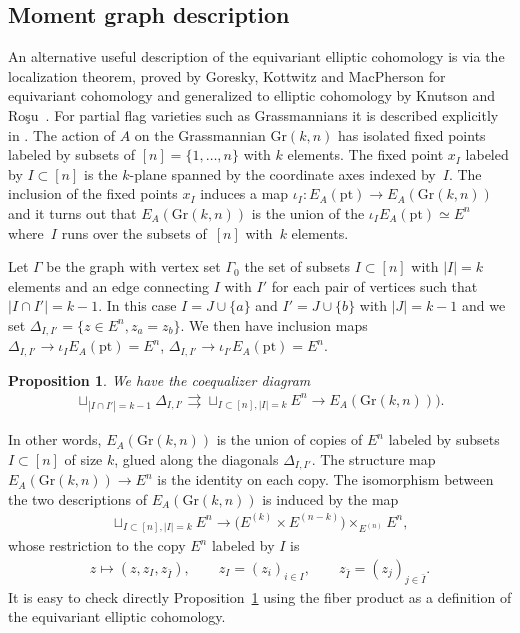 \documentclass[pdftex]{sigma}
\numberwithin{equation}{section}
\newtheorem{Proposition}[Theorem]{Proposition}
 { \theoremstyle{definition}
\newtheorem{Definition}[Theorem]{Definition}
\newtheorem{Example}[Theorem]{Example}
\newtheorem{Remark}[Theorem]{Remark} }
\begin{document}
\subsection{Moment graph description} An alternative useful description of the equivariant elliptic cohomology is via the localization theorem, proved by Goresky, Kottwitz and MacPherson \cite{GKM} for equivariant cohomology and generalized to elliptic cohomology by Knutson and Ro\c{s}u~\cite{Rosu}. For partial flag varieties such as Grassmannians it is described explicitly in \cite[Example~4.4]{Ganter}. The action of $A$ on the Grassmannian
$\mathrm{Gr}(k,n)$ has isolated fixed points labeled by subsets of $[n]=\{1,\dots,n\}$ with $k$ elements. The fixed point $x_I$ labeled by $I\subset[n]$ is the $k$-plane spanned by the coordinate axes indexed by~$I$. The inclusion of the fixed points $x_I$ induces a map $\iota_I\colon E_A(\mathrm{pt})\to E_A(\mathrm{Gr}(k,n))$ and it turns out that $E_A(\mathrm{Gr}(k,n))$ is the union of the $\iota_{I}E_A(\mathrm{pt})\simeq E^n$ where~$I$ runs over the subsets of~$[n]$ with~$k$ elements.

Let $\Gamma$ be the graph with vertex set $\Gamma_0$ the set of subsets $I\subset [n]$ with $|I|=k$ elements and an edge connecting $I$ with $I'$ for each pair of vertices such that $|I\cap I'|=k-1$. In this case $I=J\cup\{a\}$ and $I'=J\cup\{b\}$ with $|J|=k-1$ and we set $\Delta_{I,I'}=\{z\in E^n, z_a=z_b\}$. We then have inclusion maps $\Delta_{I,I'}\to \iota_{I}E_A(\mathrm {pt})=E^n$, $\Delta_{I,I'}\to \iota_{I'}E_A(\mathrm {pt})=E^n$.
\begin{Proposition}\label{p-001} We have the coequalizer diagram
 \begin{gather*}
 \sqcup_{|I\cap I'|=k-1}\Delta_{I,I'}\rightrightarrows \sqcup_{I\subset [n],|I|=k}E^n\to E_{A}(\mathrm{Gr}(k,n))).
 \end{gather*}
\end{Proposition}
In other words, $E_A(\mathrm{Gr}(k,n))$ is the union of copies of $E^n$ labeled by subsets $I\subset [n]$ of size $k$, glued along the diagonals $\Delta_{I,I'}$. The structure map $E_A(\mathrm{Gr}(k,n))\to E^n$ is the identity on each copy. The isomorphism between the two descriptions of $E_A(\mathrm{Gr}(k,n))$ is induced by the map
\begin{gather*}
 \sqcup_{I\subset [n],|I|=k}E^n\to \big(E^{(k)}\times E^{(n-k)}\big)\times_{E^{(n)}}E^n,
\end{gather*}
whose restriction to the copy $E^n$ labeled by $I$ is
\begin{gather*} z\mapsto (z,z_I,z_{\bar I}),\qquad z_I=(z_i)_{i\in I}, \qquad z_{\bar I}=(z_j)_{j\in \bar I}.
\end{gather*}
It is easy to check directly Proposition~\ref{p-001} using the fiber product as a definition of the equivariant elliptic cohomology.
\end{document}
